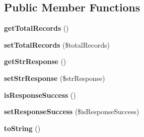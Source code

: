 \subsection*{Public Member Functions}
\begin{DoxyCompactItemize}
\item 
\hypertarget{class_app42_response_ac6329aaaf695e71dd106b4e4875d4c12}{{\bfseries get\+Total\+Records} ()}\label{class_app42_response_ac6329aaaf695e71dd106b4e4875d4c12}

\item 
\hypertarget{class_app42_response_a71d542aefbcfb5f4c5bd4db0da7f740c}{{\bfseries set\+Total\+Records} (\$total\+Records)}\label{class_app42_response_a71d542aefbcfb5f4c5bd4db0da7f740c}

\item 
\hypertarget{class_app42_response_a7d218c02b1c22595b91083316a569c17}{{\bfseries get\+Str\+Response} ()}\label{class_app42_response_a7d218c02b1c22595b91083316a569c17}

\item 
\hypertarget{class_app42_response_a34af678876992c78b5fde4b3dcc0f83b}{{\bfseries set\+Str\+Response} (\$str\+Response)}\label{class_app42_response_a34af678876992c78b5fde4b3dcc0f83b}

\item 
\hypertarget{class_app42_response_aa6d43c993a10b720dd0c65ff74aedc7b}{{\bfseries is\+Response\+Success} ()}\label{class_app42_response_aa6d43c993a10b720dd0c65ff74aedc7b}

\item 
\hypertarget{class_app42_response_a676d99b4903261c349d07226511f7236}{{\bfseries set\+Response\+Success} (\$is\+Response\+Success)}\label{class_app42_response_a676d99b4903261c349d07226511f7236}

\item 
\hypertarget{class_app42_response_a5558c5d549f41597377fa1ea8a1cefa3}{{\bfseries to\+String} ()}\label{class_app42_response_a5558c5d549f41597377fa1ea8a1cefa3}

\end{DoxyCompactItemize}
